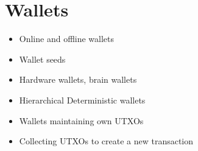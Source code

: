 \chapter{Wallets}

{\color{red}
\begin{itemize}
\item Online and offline wallets
\item Wallet seeds
\item Hardware wallets, brain wallets
\item Hierarchical Deterministic wallets
\item Wallets maintaining own UTXOs
\item Collecting UTXOs to create a new transaction
\end{itemize}
}

